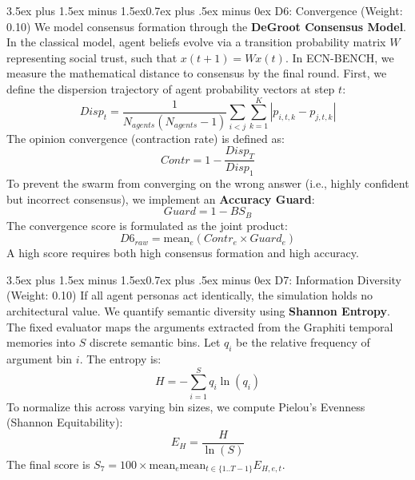 \documentclass[11pt,journal,onecolumn]{IEEEtran}
\makeatletter
\renewcommand\subsection{\@startsection{subsection}{2}{\z@}%
  {3.5ex plus 1.5ex minus 1.5ex}{0.7ex plus .5ex minus 0ex}%
  {\normalfont\normalsize\bfseries}}
\makeatother
\begin{document}
\subsection{D6: Convergence (Weight: 0.10)}
We model consensus formation through the \textbf{DeGroot Consensus Model}. In the classical model, agent beliefs evolve via a transition probability matrix $W$ representing social trust, such that $x(t+1) = W x(t)$. In ECN-BENCH, we measure the mathematical distance to consensus by the final round. First, we define the dispersion trajectory of agent probability vectors at step $t$:
\begin{equation}
    Disp_t = \frac{1}{N_{agents}(N_{agents}-1)} \sum_{i < j} \sum_{k=1}^K |p_{i,t,k} - p_{j,t,k}|
\end{equation}
The opinion convergence (contraction rate) is defined as:
\begin{equation}
    Contr = 1 - \frac{Disp_{T}}{Disp_{1}}
\end{equation}
To prevent the swarm from converging on the wrong answer (i.e., highly confident but incorrect consensus), we implement an \textbf{Accuracy Guard}:
\begin{equation}
    Guard = 1 - BS_B
\end{equation}
The convergence score is formulated as the joint product:
\begin{equation}
    D6_{raw} = \text{mean}_e (Contr_e \times Guard_e)
\end{equation}
A high score requires both high consensus formation and high accuracy.

\subsection{D7: Information Diversity (Weight: 0.10)}
If all agent personas act identically, the simulation holds no architectural value. We quantify semantic diversity using \textbf{Shannon Entropy}. The fixed evaluator maps the arguments extracted from the Graphiti temporal memories into $S$ discrete semantic bins. Let $q_i$ be the relative frequency of argument bin $i$. The entropy is:
\begin{equation}
    H = - \sum_{i=1}^S q_i \ln(q_i)
\end{equation}
To normalize this across varying bin sizes, we compute Pielou's Evenness (Shannon Equitability):
\begin{equation}
    E_H = \frac{H}{\ln(S)}
\end{equation}
The final score is $S_7 = 100 \times \text{mean}_{e} \text{mean}_{t \in \{1..T-1\}} E_{H, e, t}$.
\end{document}
